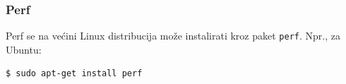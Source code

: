 \subsubsection{Perf}\label{instalacija-perf}

Perf se na većini Linux distribucija može instalirati kroz paket \texttt{perf}. Npr., za Ubuntu:

\begin{verbatim}
$ sudo apt-get install perf
\end{verbatim}
